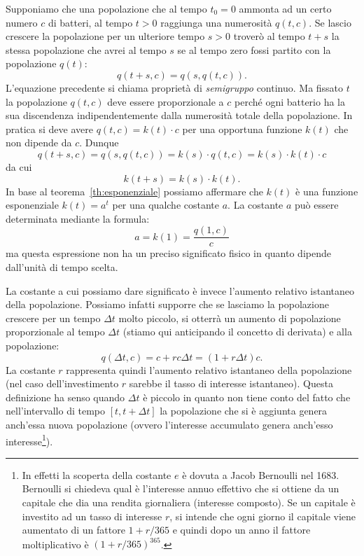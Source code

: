 Supponiamo che una popolazione che al tempo $t_0=0$
ammonta ad un certo numero $c$ di batteri, al tempo
$t>0$ raggiunga una numerosità $q(t,c)$.
Se lascio crescere la popolazione per un ulteriore
tempo $s>0$ troverò al tempo $t+s$ la stessa
popolazione che avrei al tempo $s$ se al tempo
zero fossi partito con la popolazione $q(t)$:
\[
  q(t+s,c) = q(s,q(t,c)).
\]
L'equazione precedente si chiama proprietà
di \emph{semigruppo}
%
continuo.
Ma fissato $t$ la popolazione $q(t,c)$ deve
essere proporzionale a $c$ perché ogni batterio
ha la sua discendenza indipendentemente dalla numerosità
totale della popolazione. In pratica
si deve avere $q(t,c) = k(t) \cdot c$ per una opportuna
funzione $k(t)$ che non dipende da $c$.
Dunque
\[
  q(t+s,c)
  = q(s,q(t,c))
  = k(s) \cdot q(t,c)
  = k(s) \cdot k(t) \cdot c
\]
da cui
\[
  k(t+s) = k(s) \cdot k(t).
\]
In base al teorema~\ref{th:esponenziale}
possiamo affermare
che $k(t)$ è una funzione esponenziale $k(t)=a^t$
per una qualche costante $a$.
La costante $a$ può essere determinata mediante la formula:
\[
  a = k(1) = \frac{q(1,c)}{c}
\]
ma questa espressione non ha un preciso significato fisico in quanto
dipende dall'unità di tempo scelta.

La costante a cui possiamo dare significato è invece l'aumento relativo
istantaneo della popolazione. Possiamo infatti supporre che
se lasciamo la popolazione crescere per un tempo $\Delta t$ molto piccolo,
si otterrà un aumento di popolazione proporzionale al tempo $\Delta t$
(stiamo qui anticipando il concetto di derivata) e alla popolazione:
\begin{equation}\label{eq:488464}
  q(\Delta t,c) = c + r c \Delta t = (1+r \Delta t) c.
\end{equation}
La costante $r$ rappresenta quindi l'aumento
relativo istantaneo della popolazione (nel caso dell'investimento
$r$ sarebbe il tasso di interesse istantaneo).
Questa definizione ha senso
quando $\Delta t$ è piccolo in quanto non tiene conto del fatto che
nell'intervallo di tempo $[t,t+\Delta t]$ la popolazione che si
è aggiunta genera anch'essa nuova popolazione (ovvero l'interesse
accumulato genera anch'esso interesse\footnote{%
In effetti la scoperta della costante $e$
è dovuta a Jacob Bernoulli nel 1683.
Bernoulli si chiedeva qual è l'interesse annuo effettivo
che si ottiene da un capitale che dia una rendita
giornaliera (interesse composto).
Se un capitale è investito ad un tasso di interesse $r$,
si intende che ogni giorno il capitale
viene aumentato di un fattore $1+r/365$
e quindi dopo un anno il fattore moltiplicativo è $(1+r/365)^365$.
}).

